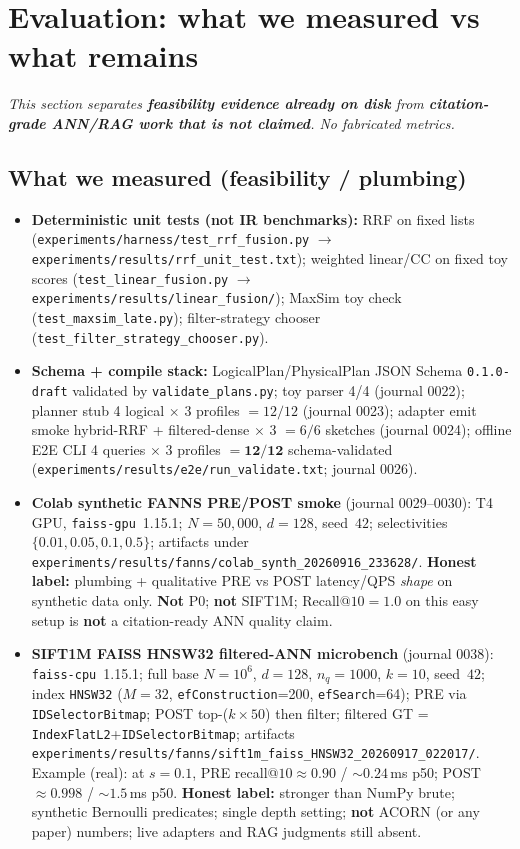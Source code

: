 \section{Evaluation: what we measured vs what remains}
\label{sec:eval}

\noindent\textit{This section separates \textbf{feasibility evidence already on disk} from \textbf{citation-grade ANN/RAG work that is not claimed}.
No fabricated metrics.}

\subsection{What we measured (feasibility / plumbing)}
\label{sec:eval-measured}
\begin{itemize}[leftmargin=*]
  \item \textbf{Deterministic unit tests (not IR benchmarks):}
    RRF on fixed lists (\texttt{experiments/harness/test\_rrf\_fusion.py} $\rightarrow$ \texttt{experiments/results/rrf\_unit\_test.txt});
    weighted linear/CC on fixed toy scores (\texttt{test\_linear\_fusion.py} $\rightarrow$ \texttt{experiments/results/linear\_fusion/});
    MaxSim toy check (\texttt{test\_maxsim\_late.py});
    filter-strategy chooser (\texttt{test\_filter\_strategy\_chooser.py}).
  \item \textbf{Schema + compile stack:}
    LogicalPlan/PhysicalPlan JSON Schema \texttt{0.1.0-draft} validated by \texttt{validate\_plans.py};
    toy parser 4/4 (journal 0022);
    planner stub 4 logical $\times$ 3 profiles $= 12/12$ (journal 0023);
    adapter emit smoke hybrid-RRF + filtered-dense $\times$ 3 $= 6/6$ sketches (journal 0024);
    offline E2E CLI 4 queries $\times$ 3 profiles $= \mathbf{12/12}$ schema-validated (\texttt{experiments/results/e2e/run\_validate.txt}; journal 0026).
  \item \textbf{Colab synthetic FANNS PRE/POST smoke} (journal 0029--0030):
    T4 GPU, \texttt{faiss-gpu}~1.15.1; $N{=}50{,}000$, $d{=}128$, seed~$42$; selectivities $\{0.01,0.05,0.1,0.5\}$;
    artifacts under \texttt{experiments/results/fanns/colab\_synth\_20260916\_233628/}.
    \textbf{Honest label:} plumbing + qualitative PRE vs POST latency/QPS \emph{shape} on synthetic data only.
    \textbf{Not} P0; \textbf{not} SIFT1M; Recall@$10{=}1.0$ on this easy setup is \textbf{not} a citation-ready ANN quality claim.
  \item \textbf{SIFT1M FAISS HNSW32 filtered-ANN microbench} (journal 0038):
    \texttt{faiss-cpu}~1.15.1; full base $N{=}10^6$, $d{=}128$, $n_q{=}1000$, $k{=}10$, seed~$42$;
    index \texttt{HNSW32} ($M{=}32$, \texttt{efConstruction}{=}200, \texttt{efSearch}{=}64);
    PRE via \texttt{IDSelectorBitmap}; POST top-($k{\times}50$) then filter;
    filtered GT = \texttt{IndexFlatL2}+\texttt{IDSelectorBitmap};
    artifacts \texttt{experiments/results/fanns/sift1m\_faiss\_HNSW32\_20260917\_022017/}.
    Example (real): at $s{=}0.1$, PRE recall@$10{\approx}0.90$ / ${\sim}0.24$\,ms p50; POST ${\approx}0.998$ / ${\sim}1.5$\,ms p50.
    \textbf{Honest label:} stronger than NumPy brute; synthetic Bernoulli predicates; single depth setting;
    \textbf{not} ACORN (or any paper) numbers; live adapters and RAG judgments still absent.
\end{itemize}
